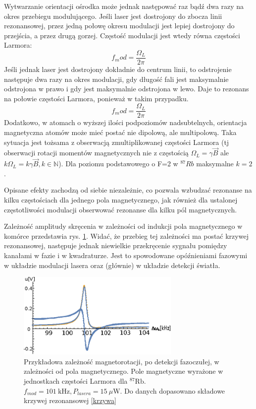 \documentclass[a4paper,10pt,twoside]{report}
\begin{document}
Wytwarzanie orientacji ośrodka może jednak następować raz bądź dwa razy na okres przebiegu modulującego. Jeśli laser jest dostrojony do zbocza linii rezonansowej, przez jedną połowę okresu modulacji jest lepiej dostrojony do przejścia, a przez drugą gorzej.
Częstość modulacji jest wtedy równa częstości Larmora:
\begin{equation}
f_mod=\frac{\Omega_L}{2 \pi}
\end{equation}
Jeśli jednak laser jest dostrojony dokładnie do centrum linii, to  odstrojenie następuje dwa razy na okres modulacji, gdy długość fali jest maksymalnie odstrojona w prawo i gdy jest maksymalnie odstrojona w lewo. Daje to rezonans na połowie częstości Larmora, ponieważ w takim przypadku.
\begin{equation}
 f_mod=\frac{ \Omega_L}{2 \pi}
\end{equation}
Dodatkowo, w atomach o wyższej ilości podpoziomów nadsubtelnych, orientacja magnetyczna atomów może mieć postać nie dipolową, ale multipolową. Taka sytuacja jest tożsama z obserwacją zmultiplikowanej częstości Larmora (tj obserwacji rotacji momentów magnetycznych nie z częstością $\Omega_L =\gamma \vec B$ ale $k \Omega_L =k \gamma \vec B, k \in \mathbb{N}$). Dla poziomu podstawowego o F=2 w ${}^{87}Rb$ maksymalne $k=2$.

Opisane efekty zachodzą od siebie niezależnie, co pozwala wzbudzać rezonanse na kilku częstościach dla jednego pola magnetycznego, jak również dla ustalonej częstotliwości modulacji obserwować rezonanse dla kilku pól magnetycznych.


 Zależność amplitudy skręcenia w zależności od indukcji pola magnetycznego w komórce przedstawia rys. \ref{fig:magnetorot1}. Widać, że przebieg tej zależności ma postać krzywej rezonansowej,  następuje jednak niewielkie przekręcenie sygnału pomiędzy kanałami w fazie i w kwadraturze. Jest to spowodowane opóźnieniami fazowymi w układzie modulacji lasera oraz (głównie) w układzie detekcji światła.
\begin{figure}[h!]
\centering
 \includegraphics[width=0.7\textwidth]{magnetorot1.eps}
 \caption{Przykładowa zależność magnetorotacji, po detekcji fazoczułej, w zależności od pola magnetycznego. Pole magnetyczne wyrażone w jednostkach częstości Larmora dla ${}^{87} \mathrm{Rb}$.
 $f_{mod}=101~\mathrm{kHz}, P_{lasera}=15~\mu$W. Do danych dopasowano składowe krzywej rezonansowej \ref{krzywa}}
 \label{fig:magnetorot1}
\end{figure}
\end{document}
